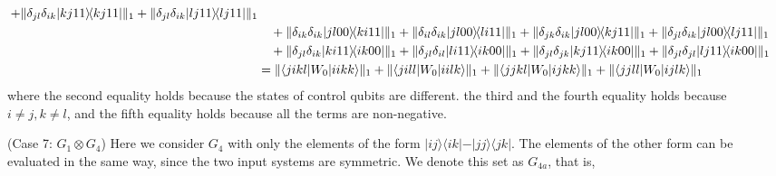 \documentclass[a4paper,twocolumn,accepted=2022-10-23]{quantumarticle}
\newcommand{\bra}[1]{\langle {#1} \vert}
\newcommand{\ket}[1]{\vert {#1} \rangle}
\newcommand{\ketbra}[2]{\vert {#1} \rangle\!\langle {#2} \vert}
\theoremstyle{definition}
\begin{document}
\begin{align}
+ \| \delta_{jl}\delta_{ik} \ketbra{kj11}{kj11} \|_1 + \| \delta_{jl}\delta_{ik} \ketbra{lj11}{lj11} \|_1 \notag\\
&\quad + \| \delta_{ik}\delta_{ik} \ketbra{jl00}{ki11} \|_1 + \| \delta_{il}\delta_{ik} \ketbra{jl00}{li11} \|_1
+ \| \delta_{jk}\delta_{ik} \ketbra{jl00}{kj11} \|_1 + \| \delta_{jl}\delta_{ik} \ketbra{jl00}{lj11} \|_1 \notag\\
&\quad + \| \delta_{jl}\delta_{ik} \ketbra{ki11}{ik00} \|_1 + \| \delta_{jl}\delta_{il} \ketbra{li11}{ik00} \|_1
+ \| \delta_{jl}\delta_{jk} \ketbra{kj11}{ik00} \|_1 + \| \delta_{jl}\delta_{jl} \ketbra{lj11}{ik00} \|_1 \\
&= \| \bra{jikl} {W_0} \ket{iikk} \|_1 + \| \bra{jill} {W_0} \ket{iilk} \|_1 + \| \bra{jjkl} {W_0} \ket{ijkk} \|_1 + \| \bra{jjll} {W_0} \ket{ijlk} \|_1 \\
\end{align}
where the second equality holds because the states of control qubits are different.
the third and the fourth equality holds because $i \neq j, k \neq l$,
and the fifth equality holds because all the terms are non-negative.




(Case 7: $G_1 \otimes G_4$) \quad
Here we consider $ G_4 $ with only the elements of the form $ \ketbra{ij}{ik} - \ketbra{jj}{jk} $.
The elements of the other form can be evaluated in the same way, since the two input systems are symmetric.
We denote this set as $G_{4a}$, that is,
\end{document}
